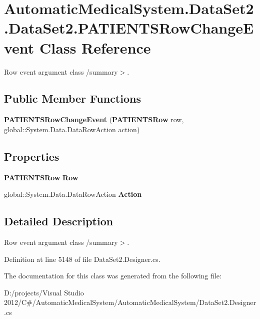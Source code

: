 \section{AutomaticMedicalSystem.DataSet2.DataSet2.PATIENTSRowChangeEvent Class Reference}
\label{class_automatic_medical_system_1_1_data_set2_1_1_p_a_t_i_e_n_t_s_row_change_event}
Row event argument class /summary$>$.  


\subsection*{Public Member Functions}
\begin{CompactItemize}
\item 
\textbf{PATIENTSRowChangeEvent} ({\bf PATIENTSRow} row, global::System.Data.DataRowAction action)\label{class_automatic_medical_system_1_1_data_set2_1_1_p_a_t_i_e_n_t_s_row_change_event_480c7573cf3728f6353617fbac14d3d5}

\end{CompactItemize}
\subsection*{Properties}
\begin{CompactItemize}
\item 
{\bf PATIENTSRow} \textbf{Row}\hspace{0.3cm}{\tt  [get]}\label{class_automatic_medical_system_1_1_data_set2_1_1_p_a_t_i_e_n_t_s_row_change_event_8a3d0eba1dd5a6487539edb35627619c}

\item 
global::System.Data.DataRowAction \textbf{Action}\hspace{0.3cm}{\tt  [get]}\label{class_automatic_medical_system_1_1_data_set2_1_1_p_a_t_i_e_n_t_s_row_change_event_41cf2ebb7e30b5db75ab80419c3f54cc}

\end{CompactItemize}


\subsection{Detailed Description}
Row event argument class /summary$>$. 

Definition at line 5148 of file DataSet2.Designer.cs.

The documentation for this class was generated from the following file:\begin{CompactItemize}
\item 
D:/projects/Visual Studio 2012/C\#/AutomaticMedicalSystem/AutomaticMedicalSystem/DataSet2.Designer.cs\end{CompactItemize}
